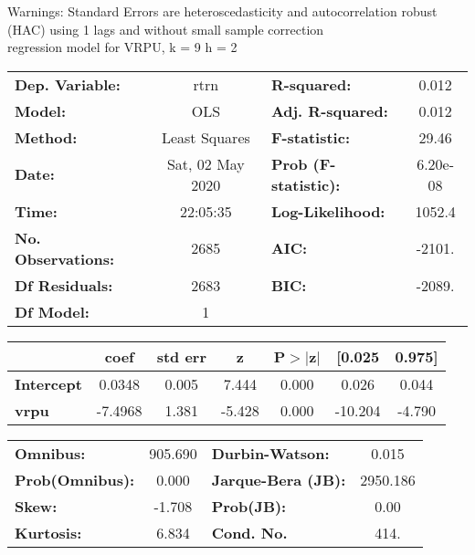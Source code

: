 Warnings: \newline
 [1] Standard Errors are heteroscedasticity and autocorrelation robust (HAC) using 1 lags and without small sample correction\\ 

regression model for VRPU, k = 9 h = 2\begin{center}
\begin{tabular}{lclc}
\toprule
\textbf{Dep. Variable:}    &       rtrn       & \textbf{  R-squared:         } &     0.012   \\
\textbf{Model:}            &       OLS        & \textbf{  Adj. R-squared:    } &     0.012   \\
\textbf{Method:}           &  Least Squares   & \textbf{  F-statistic:       } &     29.46   \\
\textbf{Date:}             & Sat, 02 May 2020 & \textbf{  Prob (F-statistic):} &  6.20e-08   \\
\textbf{Time:}             &     22:05:35     & \textbf{  Log-Likelihood:    } &    1052.4   \\
\textbf{No. Observations:} &        2685      & \textbf{  AIC:               } &    -2101.   \\
\textbf{Df Residuals:}     &        2683      & \textbf{  BIC:               } &    -2089.   \\
\textbf{Df Model:}         &           1      & \textbf{                     } &             \\
\bottomrule
\end{tabular}
\begin{tabular}{lcccccc}
                   & \textbf{coef} & \textbf{std err} & \textbf{z} & \textbf{P$> |$z$|$} & \textbf{[0.025} & \textbf{0.975]}  \\
\midrule
\textbf{Intercept} &       0.0348  &        0.005     &     7.444  &         0.000        &        0.026    &        0.044     \\
\textbf{vrpu}      &      -7.4968  &        1.381     &    -5.428  &         0.000        &      -10.204    &       -4.790     \\
\bottomrule
\end{tabular}
\begin{tabular}{lclc}
\textbf{Omnibus:}       & 905.690 & \textbf{  Durbin-Watson:     } &    0.015  \\
\textbf{Prob(Omnibus):} &   0.000 & \textbf{  Jarque-Bera (JB):  } & 2950.186  \\
\textbf{Skew:}          &  -1.708 & \textbf{  Prob(JB):          } &     0.00  \\
\textbf{Kurtosis:}      &   6.834 & \textbf{  Cond. No.          } &     414.  \\
\bottomrule
\end{tabular}
\end{center}

